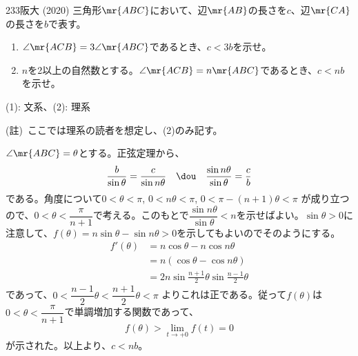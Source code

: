 \begin{thm}{233}{}{阪大 (2020)}
 三角形$\mr{ABC}$において、辺$\mr{AB}$の長さを$c$、辺$\mr{CA}$の長さを$b$で表す。
 \begin{enumerate}
  \item $\angle\mr{ACB}=3\angle\mr{ABC}$であるとき、$c<3b$を示せ。
  \item $n$を2以上の自然数とする。$\angle\mr{ACB}=n\mr{ABC}$であるとき、$c<nb$を示せ。
 \end{enumerate}
 \begin{flushright}
  {\small (1): 文系、(2): 理系}
 \end{flushright}
\end{thm}

(註)~ここでは理系の読者を想定し、(2)のみ記す。

$\angle\mr{ABC}=\theta$とする。正弦定理から、
\[ \frac{b}{\sin\theta}=\frac{c}{\sin n\theta} \quad\dou\quad \frac{\sin n\theta}{\sin\theta}=\frac{c}{b} \]
である。角度について$0<\theta<\pi$, $0<n\theta<\pi$, $0<\pi-(n+1)\theta<\pi$ が成り立つので、$0<\theta<\dfrac{\pi}{n+1}$で考える。このもとで$\dfrac{\sin n\theta}{\sin\theta}<n$を示せばよい。$\sin\theta>0$に注意して、$f(\theta)=n\sin\theta-\sin n\theta>0$を示してもよいのでそのようにする。
\begin{align*}
 f'(\theta)&=n\cos\theta-n\cos n\theta \\
 &=n(\cos\theta-\cos n\theta) \\
 &=2n\sin\frac{n+1}{2}\theta\sin\frac{n-1}{2}\theta
\end{align*}
であって、$0<\dfrac{n-1}{2}\theta<\dfrac{n+1}{2}\theta<\pi$ よりこれは正である。従って$f(\theta)$は$0<\theta<\dfrac{\pi}{n+1}$で単調増加する関数であって、
\[ f(\theta)>\lim_{t\to+0}f(t)=0 \]
が示された。以上より、$c<nb$。